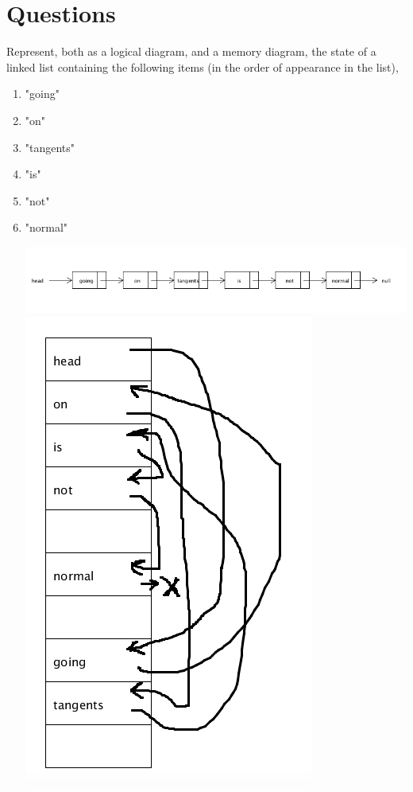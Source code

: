\section*{Questions}
\begin{questions}

\question Represent, both as a logical diagram, and a memory diagram, the state of a linked list containing the following items (in the order of appearance in the list),

\begin{enumerate}
\item "going"
\item "on"
\item "tangents"
\item "is"
\item "not"
\item "normal"	

\begin{solution}
\includegraphics[scale=0.5]{logical.png}	
\vskip 1cm
\includegraphics[scale=0.5]{memory.png}
\end{solution}


\end{enumerate}
\end{questions}
